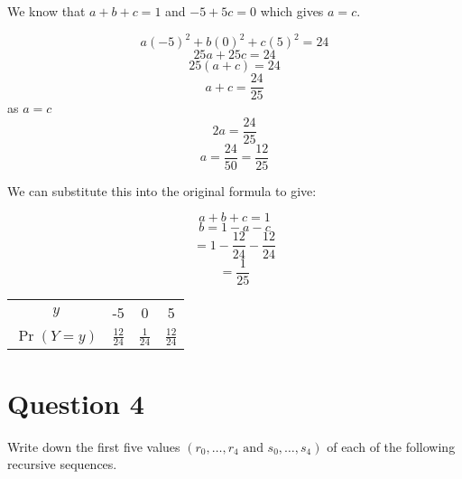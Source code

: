 \documentclass[11pt]{article}
\begin{document}
We know that $a + b + c = 1$ and $-5 + 5c = 0$ which gives $a = c$.

\[ a{(-5)}^2 + b{(0)}^2 + c{(5)}^2 = 24 \]
\[ 25a + 25c = 24 \]
\[ 25(a + c) = 24 \]
\[ a + c = \frac{24}{25} \]
as $a = c$ \[ 2a = \frac{24}{25} \]
\[ a = \frac{24}{50} = \frac{12}{25} \]

We can substitute this into the original formula to give:

\[ a + b + c = 1 \]
\[ b = 1 - a - c \]
\[ = 1 - \frac{12}{24} - \frac{12}{24} \]
\[ = \frac{1}{25} \]

\begin{center}
  \begin{tabular}{c c c c}
    \toprule
    $y$ & -5 & 0 & 5 \\
    $\Pr(Y=y)$ & $\frac{12}{24}$ & $\frac{1}{24}$ & $\frac{12}{24}$ \\
    \bottomrule
  \end{tabular}
\end{center}

\break{}
\section*{Question 4}

Write down the first five values $(r_0, \dots, r_4 \text{ and } s_0, \dots,
s_4)$ of each of the following recursive sequences.
\end{document}
